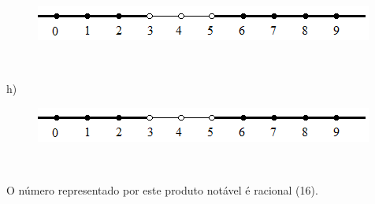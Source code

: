 \begin{respostas}{5}
\begin{figure}[H]
	\begin{Center}
		\includegraphics[width=4.38in,height=0.45in]{capitulos/conjuntos_numericos/media/image21.png}
	\end{Center}
\end{figure}

~~

 h)

\begin{figure}[H]
	\begin{Center}
		\includegraphics[width=4.38in,height=0.45in]{capitulos/conjuntos_numericos/media/image21.png}
	\end{Center}
\end{figure}

~~

\ansitem{} O número representado por este produto notável é racional (16).

\end{respostas}
